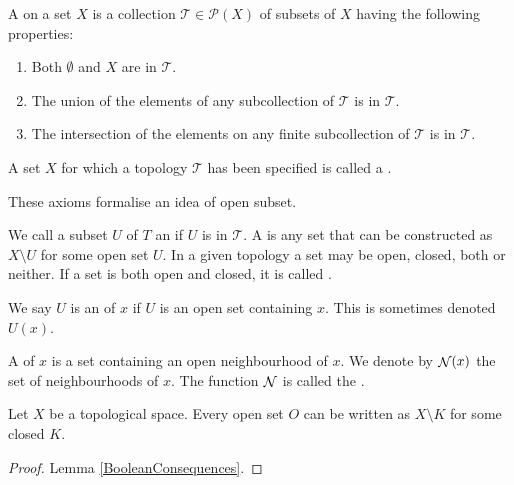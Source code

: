 \begin{definition}
A  on a set $X$ is a collection $\mathcal{T}\in \mathcal{P}(X)$ of subsets of $X$ having the following properties:
\begin{enumerate}
\item Both $\emptyset$ and $X$ are in $\mathcal{T}$.
\item The union of the elements of any subcollection of $\mathcal{T}$ is in $\mathcal{T}$.
\item The intersection of the elements on any finite subcollection of $\mathcal{T}$ is in $\mathcal{T}$.
\end{enumerate}
A set $X$ for which a topology $\mathcal{T}$ has been specified is called a .
\end{definition}
These axioms formalise an idea of open subset.
\begin{definition}
We call a subset $U$ of $T$ an  if $U$ is in $\mathcal{T}$. A  is any set that can be constructed as $X \setminus U$ for some open set $U$. In a given topology a set may be open, closed, both or neither. If a set is both open and closed, it is called .

We say $U$ is an  of $x$ if $U$ is an open set containing $x$. This is sometimes denoted $U(x)$.

A  of $x$ is a set containing an open neighbourhood of $x$. We denote by $\mathop{\mathcal{N}}(x)$ the set of neighbourhoods of $x$. The function $\mathop{\mathcal{N}}$ is called the .
\end{definition}

\begin{lemma}
Let $X$ be a topological space. Every open set $O$ can be written as $X\setminus K$ for some closed $K$.
\end{lemma}
\begin{proof}
Lemma \ref{BooleanConsequences}.
\end{proof}

